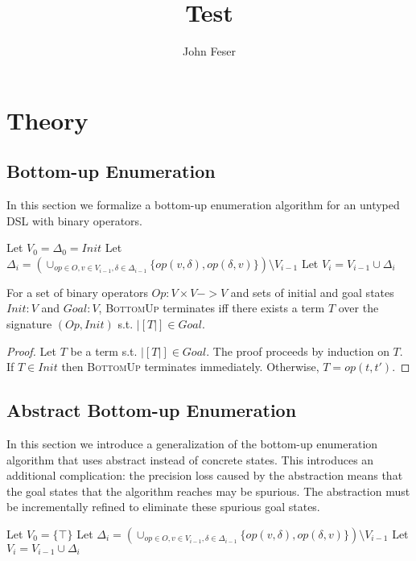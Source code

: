\documentclass[review]{acmart}
\author{John Feser}
\title{Test}
\begin{document}
\section{Theory}
\subsection{Bottom-up Enumeration}

In this section we formalize a bottom-up enumeration algorithm for an untyped
DSL with binary operators.

\begin{algorithm}
  \begin{algorithmic}
    \State Let $V_0 = \Delta_0 = Init$
    \State \Return
    \EndIf
    \State Let $\Delta_{i} = (\cup_{op \in O, v \in V_{i - 1}, \delta \in \Delta_{i
        - 1}} \{op(v, \delta), op(\delta, v)\}) \setminus V_{i - 1}$
    \State Let $V_i = V_{i - 1} \cup \Delta_{i}$
    \EndFor
    \EndFunction
  \end{algorithmic}
\end{algorithm}

\begin{theorem}
  For a set of binary operators $Op : V \times V -> V$ and sets of initial and
  goal states $Init : V$ and $Goal: V$, \textsc{BottomUp} terminates iff there
  exists a term $T$ over the signature $(Op, Init)$ s.t. $|[T|] \in Goal$.
\end{theorem}
\begin{proof}
  Let $T$ be a term s.t. $|[T|] \in Goal$. The proof proceeds by induction on
  $T$. If $T \in Init$ then \textsc{BottomUp} terminates immediately. Otherwise,
  $T = op(t, t')$. 
\end{proof}

\subsection{Abstract Bottom-up Enumeration}

In this section we introduce a generalization of the bottom-up enumeration
algorithm that uses abstract instead of concrete states. This introduces an
additional complication: the precision loss caused by the abstraction means that
the goal states that the algorithm reaches may be spurious. The abstraction must
be incrementally refined to eliminate these spurious goal states.

\begin{algorithm}
  \begin{algorithmic}
    \State Let $V_0 = \{\top\}$
    \State \Return
    \EndIf
    \State Let $\Delta_{i} = (\cup_{op \in O, v \in V_{i - 1}, \delta \in \Delta_{i
        - 1}} \{op(v, \delta), op(\delta, v)\}) \setminus V_{i - 1}$
    \State Let $V_i = V_{i - 1} \cup \Delta_{i}$
    \EndFor
    \EndFunction
  \end{algorithmic}
\end{algorithm}
\end{document}
